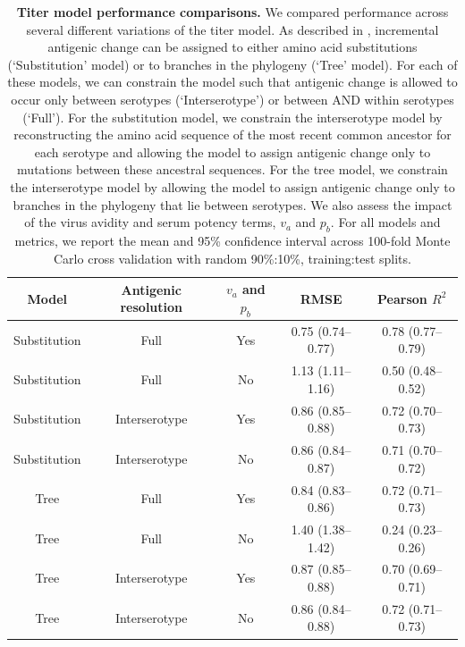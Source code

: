 \documentclass[11pt,oneside,letterpaper]{article}
\begin{document}
\begin{table}[ht]
  \centering
  \caption{
    \textbf{Titer model performance comparisons.}
    We compared performance across several different variations of the titer model.
    As described in \citet{neher2016prediction}, incremental antigenic change can be assigned to either amino acid substitutions (`Substitution' model) or to branches in the phylogeny (`Tree' model).
    For each of these models, we can constrain the model such that antigenic change is allowed to occur only between serotypes (`Interserotype') or between AND within serotypes (`Full').
    For the substitution model, we constrain the interserotype model by reconstructing the amino acid sequence of the most recent common ancestor for each serotype and allowing the model to assign antigenic change only to mutations between these ancestral sequences.
    For the tree model, we constrain the interserotype model by allowing the model to assign antigenic change only to branches in the phylogeny that lie between serotypes.
    We also assess the impact of the virus avidity and serum potency terms, $v_a$ and $p_b$.
    For all models and metrics, we report the mean and 95\% confidence interval across 100-fold Monte Carlo cross validation with random 90\%:10\%, training:test splits.
  }
  \label{titer_model_performance}
  \begin{tabular}[ht]{ c c c c c }
    Model         & Antigenic resolution  & $v_a$ and $p_b$ & RMSE              & Pearson $R^2$ \\
    \hline
    Substitution  & Full             & Yes             & 0.75 (0.74--0.77) & 0.78 (0.77--0.79) \\
    Substitution  & Full             & No              & 1.13 (1.11--1.16) & 0.50 (0.48--0.52) \\
    Substitution  & Interserotype    & Yes             & 0.86 (0.85--0.88) & 0.72 (0.70--0.73) \\
    Substitution  & Interserotype    & No              & 0.86 (0.84--0.87) & 0.71 (0.70--0.72) \\
    Tree          & Full             & Yes             & 0.84 (0.83--0.86) & 0.72 (0.71--0.73) \\
    Tree          & Full             & No              & 1.40 (1.38--1.42) & 0.24 (0.23--0.26) \\
    Tree          & Interserotype    & Yes             & 0.87 (0.85--0.88) & 0.70 (0.69--0.71) \\
    Tree          & Interserotype    & No              & 0.86 (0.84--0.88) & 0.72 (0.71--0.73) \\
    \hline
  \end{tabular}
\end{table}
\end{document}
